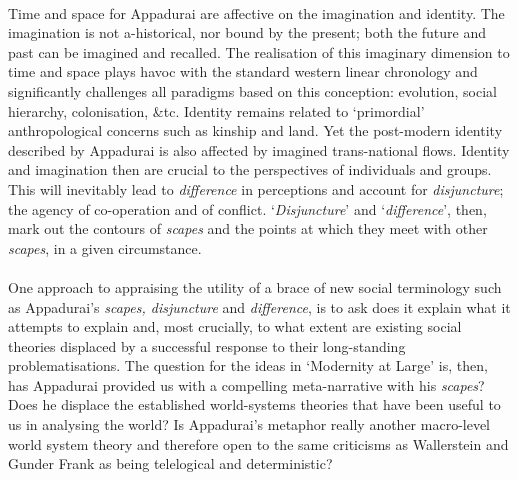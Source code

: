 \documentclass{article}
\begin{document}
\begin{doublespacing}
\paragraph{}Time and space for Appadurai are affective on the imagination and identity. The imagination is not a-historical, nor bound by the present; both the future and past can be imagined and recalled. The realisation of this imaginary dimension to time and space plays havoc with the standard western linear chronology and significantly challenges all paradigms based on this conception: evolution, social hierarchy, colonisation, \&tc. Identity remains related to `primordial' \cite[Ch .7]{Appadurai:1996lp} anthropological concerns such as kinship and land. Yet the post-modern identity described by Appadurai is also affected by imagined trans-national flows. Identity and imagination then are crucial to the perspectives of individuals and groups. This will inevitably lead to \emph{difference} in perceptions and account for \emph{disjuncture}; the agency of co-operation and of conflict. `\emph{Disjuncture}' and `\emph{difference}', then, mark out the contours of  \emph{scapes} and the points at which they meet with other \emph{scapes}, in a given circumstance. 

\paragraph{}One approach to appraising the utility of a brace of new social terminology such as Appadurai's \emph{scapes, disjuncture} and \emph{difference}, is to ask does it explain what it attempts to explain and, most crucially, to what extent are existing social theories displaced by a successful response to their long-standing problematisations. The question for the ideas in `Modernity at Large' is, then, has Appadurai provided us with a compelling meta-narrative with his \emph{scapes}? Does he displace the established world-systems theories that have been useful to us in analysing the world? Is Appadurai's metaphor really another macro-level world system theory and therefore open to the same criticisms as Wallerstein and Gunder Frank as being telelogical and deterministic?


\end{doublespacing}
\end{document}
